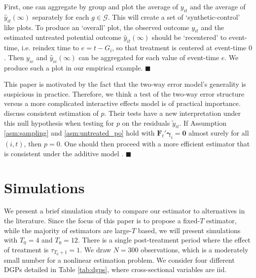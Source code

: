 \documentclass[12pt]{article}
\begin{document}
\begin{remark}
First, one can aggregate by group and plot the average of $y_{it}$ and the average of $\hat{y}_{it}(\infty)$ separately for each $g \in \mathcal{G}$. This will create a set of `synthetic-control' like plots. To produce an `overall' plot, the observed outcome $y_{it}$ and the estimated untreated potential outcome $\hat{y}_{it}(\infty)$ should be `recentered' to event-time, i.e. reindex time to $e = t - G_i$, so that treatment is centered at event-time $0$. Then $y_{ie}$ and $\hat{y}_{ie}(\infty)$ can be aggregated for each value of event-time $e$. We produce such a plot in our empirical example. $\blacksquare$

\end{remark}

\begin{remark}\label{remark:twfe_testing}
  This paper is motivated by the fact that the two-way error model's generality is suspicious in practice. Therefore, we think a test of the two-way error structure versus a more complicated interactive effects model is of practical importance. \citet{Ahn_Lee_Schmidt_2013} discuss consistent estimation of $p$. Their tests have a new interpretation under this null hypothesis when testing for $p$ on the residuals $\tilde{y}_{it}$. If Assumption \ref{asm:sampling} and \ref{asm:untreated_po} hold with $\bm{F}_t' \bm \gamma_i = \bm 0$ almost surely for all $(i,t)$, then $p = 0$. One should then proceed with a more efficient estimator that is consistent under the additive model \citep{Gardner_2021,Wooldridge_2021,Borusyak_Jaravel_Spiess_2021}. $\blacksquare$
\end{remark}






\section{Simulations}\label{sec:simulations}

We present a brief simulation study to compare our estimator to alternatives in the literature. Since the focus of this paper is to propose a fixed-$T$ estimator, while the majority of estimators are large-$T$ based, we will present simulations with $T_0 = 4$ and $T_0 = 12$. There is a single post-treatment period where the effect of treatment is $\tau_{T_0 + 1} = 1$. We draw $N = 300$ observations, which is a moderately small number for a nonlinear estimation problem. We consider four different DGPs detailed in Table \ref{tab:dgps}, where cross-sectional variables are iid.
\end{document}
